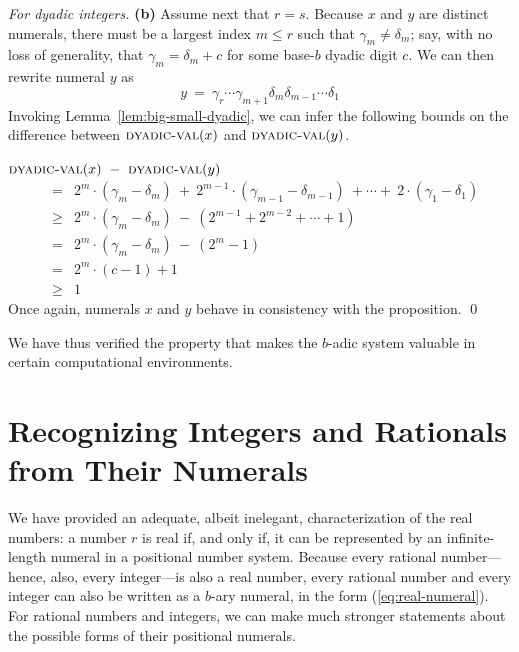 \begin{proof}[For dyadic integers]
\smallskip

{\bf (b)} Assume next that $r = s$.  Because $x$ and $y$ are distinct numerals, there must be a largest index $m \leq r$ such that $\gamma_m \neq \delta_m$; say, with no loss of generality, that $\gamma_m = \delta_m + c$ for some base-$b$ dyadic digit $c$.  We can then rewrite numeral $y$ as
\[ y \ = \ \gamma_r \cdots \gamma_{m+1} \delta_m \delta_{m-1} \cdots \delta_1 \]
Invoking Lemma~\ref{lem:big-small-dyadic}, we can infer the following bounds on the difference between $\mbox{\sc dyadic-val}(x)$ and $\mbox{\sc dyadic-val}(y)$.

\bigskip

$\mbox{\sc dyadic-val}(x) \ - \ \mbox{\sc dyadic-val}(y)$
\begin{eqnarray*}
  & =  &
2^m \cdot (\gamma_m - \delta_m) \ + \ 2^{m-1} \cdot (\gamma_{m-1} -
\delta_{m-1}) \ + \cdots + \  2 \cdot (\gamma_1 - \delta_1) \\
  & \geq &
2^m \cdot (\gamma_m - \delta_m) \ - \ \left( 2^{m-1} + 2^{m-2} +
\cdots + 1 \right) \\
  & = &
2^m \cdot (\gamma_m - \delta_m)\ - \ \left( 2^m -1 \right) \\
  & = &
2^m \cdot (c-1) +1 \\
  & \geq & 1
\end{eqnarray*}
Once again, numerals $x$ and $y$ behave in consistency with the proposition.  \qed
\end{proof}

We have thus verified the property that makes the $b$-adic system valuable in certain computational environments.


\section{Recognizing Integers and  Rationals from Their Numerals}
\label{sec:special-numerals-N-Q}

We have provided an adequate, albeit inelegant, characterization of the real numbers: a number $r$ is real if, and only if, it can be represented by an infinite-length numeral in a positional number system.  Because every rational number---hence, also, every integer---is also a real number, every rational number and every integer can also be written as a $b$-ary numeral, in the form (\ref{eq:real-numeral}).  For rational numbers and integers, we can make much stronger statements about the possible forms of their positional numerals.

